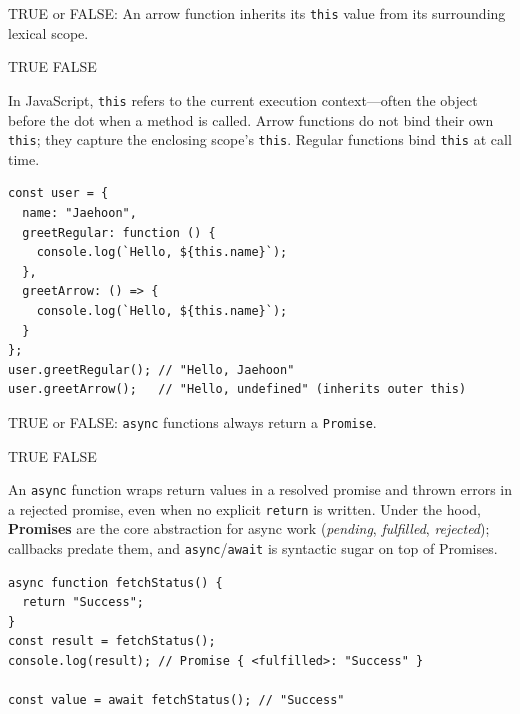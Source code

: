 \question[4]
TRUE or FALSE: An arrow function inherits its \lstinline[style=jsinline]|this| value from its surrounding lexical scope.
\begin{choices}
  \CorrectChoice TRUE
  \choice FALSE
\end{choices}
\begin{solution}
  In JavaScript, \lstinline[style=jsinline]|this| refers to the current execution context---often the object before the dot when a method is called. Arrow functions do not bind their own \lstinline[style=jsinline]|this|; they capture the enclosing scope's \lstinline[style=jsinline]|this|. Regular functions bind \lstinline[style=jsinline]|this| at call time.
\begin{lstlisting}[style=js]
const user = {
  name: "Jaehoon",
  greetRegular: function () {
    console.log(`Hello, ${this.name}`);
  },
  greetArrow: () => {
    console.log(`Hello, ${this.name}`);
  }
};
user.greetRegular(); // "Hello, Jaehoon"
user.greetArrow();   // "Hello, undefined" (inherits outer this)
\end{lstlisting}
\end{solution}

\question[4]
TRUE or FALSE: \lstinline[style=jsinline]|async| functions always return a \lstinline[style=jsinline]|Promise|.
\begin{choices}
  \CorrectChoice TRUE
  \choice FALSE
\end{choices}
\begin{solution}
  An \lstinline[style=jsinline]|async| function wraps return values in a resolved promise and thrown errors in a rejected promise, even when no explicit \lstinline[style=jsinline]|return| is written. Under the hood, \textbf{Promises} are the core abstraction for async work (\emph{pending}, \emph{fulfilled}, \emph{rejected}); callbacks predate them, and \lstinline[style=jsinline]|async|/\lstinline[style=jsinline]|await| is syntactic sugar on top of Promises.
\begin{lstlisting}[style=js]
async function fetchStatus() {
  return "Success";
}
const result = fetchStatus();
console.log(result); // Promise { <fulfilled>: "Success" }

const value = await fetchStatus(); // "Success"
\end{lstlisting}
\end{solution}

